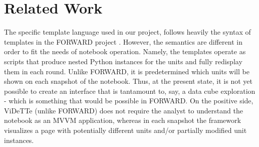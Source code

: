 \vspace*{-0.3cm}
\section{Related Work}
\label{section:related-work}


The specific template language used in our project, follows heavily the syntax of templates in the FORWARD project \cite{SIGMOD2010,CIDR2011}. However, the semantics are different in order to fit the needs of notebook operation. Namely, the templates operate as scripts that produce nested Python instances for the units and fully redisplay them in each round. Unlike FORWARD, it is predetermined which units will be shown on each snapshot of the notebook. Thus, at the present state, it is not yet possible to create an interface that is tantamount to, say, a data cube exploration - which is something that would be possible in FORWARD. On the positive side, ViDeTTe (unlike FORWARD) does not require the analyst to understand the notebook as an MVVM application, whereas in each snapshot the framework visualizes a page with potentially different units and/or partially modified unit instances. 

